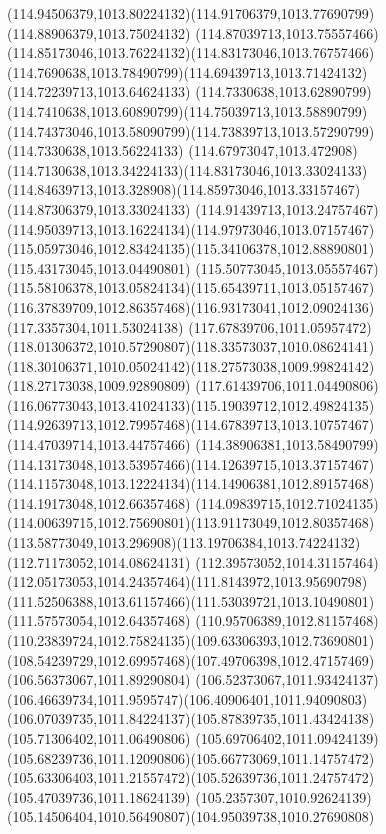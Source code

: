 {{		\curveto(114.94506379,1013.80224132)(114.91706379,1013.77690799)(114.88906379,1013.75024132)
		\curveto(114.87039713,1013.75557466)(114.85173046,1013.76224132)(114.83173046,1013.76757466)
		\curveto(114.7690638,1013.78490799)(114.69439713,1013.71424132)(114.72239713,1013.64624133)
		\curveto(114.7330638,1013.62890799)(114.7410638,1013.60890799)(114.75039713,1013.58890799)
		\curveto(114.74373046,1013.58090799)(114.73839713,1013.57290799)(114.7330638,1013.56224133)
		\curveto(114.67973047,1013.472908)(114.7130638,1013.34224133)(114.83173046,1013.33024133)
		\curveto(114.84639713,1013.328908)(114.85973046,1013.33157467)(114.87306379,1013.33024133)
		\curveto(114.91439713,1013.24757467)(114.95039713,1013.16224134)(114.97973046,1013.07157467)
		\curveto(115.05973046,1012.83424135)(115.34106378,1012.88890801)(115.43173045,1013.04490801)
		\curveto(115.50773045,1013.05557467)(115.58106378,1013.05824134)(115.65439711,1013.05157467)
		\curveto(116.37839709,1012.86357468)(116.93173041,1012.09024136)(117.3357304,1011.53024138)
		\curveto(117.67839706,1011.05957472)(118.01306372,1010.57290807)(118.33573037,1010.08624141)
		\curveto(118.30106371,1010.05024142)(118.27573038,1009.99824142)(118.27173038,1009.92890809)
		\curveto(117.61439706,1011.04490806)(116.06773043,1013.41024133)(115.19039712,1012.49824135)
		\curveto(114.92639713,1012.79957468)(114.67839713,1013.10757467)(114.47039714,1013.44757466)
		\curveto(114.38906381,1013.58490799)(114.13173048,1013.53957466)(114.12639715,1013.37157467)
		\curveto(114.11573048,1013.12224134)(114.14906381,1012.89157468)(114.19173048,1012.66357468)
		\curveto(114.09839715,1012.71024135)(114.00639715,1012.75690801)(113.91173049,1012.80357468)
		\curveto(113.58773049,1013.296908)(113.19706384,1013.74224132)(112.71173052,1014.08624131)
		\curveto(112.39573052,1014.31157464)(112.05173053,1014.24357464)(111.8143972,1013.95690798)
		\curveto(111.52506388,1013.61157466)(111.53039721,1013.10490801)(111.57573054,1012.64357468)
		\curveto(110.95706389,1012.81157468)(110.23839724,1012.75824135)(109.63306393,1012.73690801)
		\curveto(108.54239729,1012.69957468)(107.49706398,1012.47157469)(106.56373067,1011.89290804)
		\curveto(106.52373067,1011.93424137)(106.46639734,1011.9595747)(106.40906401,1011.94090803)
		\curveto(106.07039735,1011.84224137)(105.87839735,1011.43424138)(105.71306402,1011.06490806)
		\curveto(105.69706402,1011.09424139)(105.68239736,1011.12090806)(105.66773069,1011.14757472)
		\curveto(105.63306403,1011.21557472)(105.52639736,1011.24757472)(105.47039736,1011.18624139)
		\curveto(105.2357307,1010.92624139)(105.14506404,1010.56490807)(104.95039738,1010.27690808)
}}
